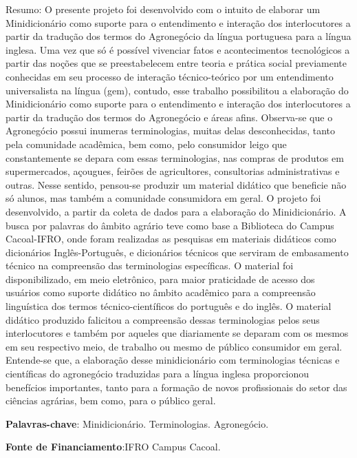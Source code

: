 \documentclass[article,12pt,onesidea,4paper,english,brazil]{abntex2}
\begin{document}
	\noindent Resumo: O presente projeto foi desenvolvido com o intuito de elaborar um
	Minidicionário como suporte para o entendimento e interação dos interlocutores a
	partir da tradução dos termos do Agronegócio da língua portuguesa para a língua
	inglesa. Uma vez que só é possível vivenciar fatos e acontecimentos tecnológicos a
	partir das noções que se preestabelecem entre teoria e prática social previamente
	conhecidas em seu processo de interação técnico-teórico por um entendimento
	universalista na língua (gem), contudo, esse trabalho possibilitou a elaboração do
	Minidicionário como suporte para o entendimento e interação dos interlocutores a
	partir da tradução dos termos do Agronegócio e áreas afins. Observa-se que o
	Agronegócio possui inumeras terminologias, muitas delas desconhecidas, tanto pela
	comunidade acadêmica, bem como, pelo consumidor leigo que constantemente se
	depara com essas terminologias, nas compras de produtos em supermercados,
	açougues, feirões de agricultores, consultorias administrativas e outras. Nesse
	sentido, pensou-se produzir um material didático que beneficie não só alunos, mas
	também a comunidade consumidora em geral. O projeto foi desenvolvido, a partir da
	coleta de dados para a elaboração do Minidicionário. A busca por palavras do
	âmbito agrário teve como base a Biblioteca do Campus Cacoal-IFRO, onde foram
	realizadas as pesquisas em materiais didáticos como dicionários Inglês-Português, e
	dicionários técnicos que serviram de embasamento técnico na compreensão das
	terminologias específicas. O material foi disponibilizado, em meio eletrônico, para
	maior praticidade de acesso dos usuários como suporte didático no âmbito
	acadêmico para a compreensão linguística dos termos técnico-científicos do
	português e do inglês. O material didático produzido falicitou a compreensão dessas
	terminologias pelos seus interlocutores e também por aqueles que diariamente se
	deparam com os mesmos em seu respectivo meio, de trabalho ou mesmo de público
	consumidor em geral. Entende-se que, a elaboração desse minidicionário com
	terminologias técnicas e científicas do agronegócio traduzidas para a língua inglesa
	proporcionou benefícios importantes, tanto para a formação de novos profissionais
	do setor das ciências agrárias, bem como, para o público geral.
	
	\vspace{\onelineskip}
	
	\noindent
	\textbf{Palavras-chave}: Minidicionário. Terminologias. Agronegócio.
	  
	\noindent
	\textbf{Fonte de Financiamento}:IFRO Campus Cacoal.
	
\end{document}
